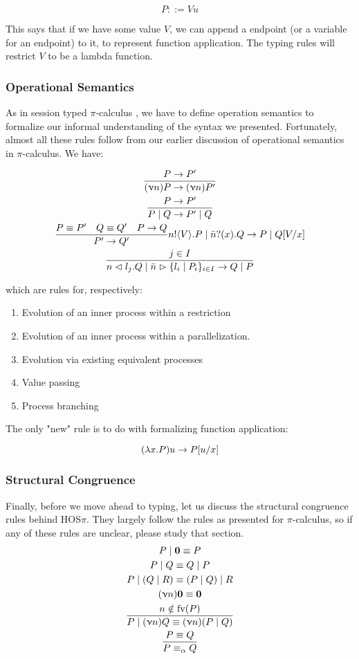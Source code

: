 $$
P ::= V u
$$

This says that if we have some value $V$, we can append a endpoint (or a variable for an endpoint) to it, to represent function application. The typing rules will restrict $V$ to be a lambda function.



\subsubsection{Operational Semantics}

As in session typed $\pi$-calculus , we have to define operation semantics to formalize our informal understanding of the syntax we presented. Fortunately, almost all these rules follow from our earlier discussion of operational semantics in $\pi$-calculus. We have:

\begin{gather*}
\frac{P \rightarrow P'}{(\upnu n)P \rightarrow (\upnu n)P'} \\
\frac{P \rightarrow P'}{P \mid Q \rightarrow P' \mid Q} \\
\frac{P \equiv P' \quad Q \equiv Q' \quad P \rightarrow Q}{P' \rightarrow Q'}
n!\langle V \rangle . P \mid \bar{n}?(x).Q \rightarrow P \mid Q[V / x] \\
\frac{j \in I}{n \vartriangleleft l_j .Q \mid \bar{n} \vartriangleright \{l_i \mid P_i\}_{i \in I} \rightarrow Q \mid P}
\end{gather*}

which are rules for, respectively:
\begin{enumerate}
    \item Evolution of an inner process within a restriction
    \item Evolution of an inner process within a parallelization.
    \item Evolution via existing equivalent processes
    \item Value passing
    \item Process branching
\end{enumerate}

The only "new" rule is to do with formalizing function application:


$$
(\lambda x . P) u \rightarrow P [ u / x]
$$

\subsubsection{Structural Congruence}
Finally, before we move ahead to typing, let us discuss the structural congruence rules behind HOS$\pi$. They largely follow the rules as presented for $\pi$-calculus, so if any of these rules are unclear, please study that section.
\begin{gather*}
P \mid \textbf{0} \equiv P \\
P \mid Q \equiv Q \mid P \\
P \mid (Q \mid R) \equiv (P \mid Q) \mid R \\
(\upnu n) \textbf{0} \equiv \textbf{0} \\
\frac{n \notin \text{fv}(P)}{P \mid (\upnu n) Q \equiv (\upnu n)(P \mid Q)} \\
\frac{P \equiv Q}{P \equiv_\alpha Q}
\end{gather*}

